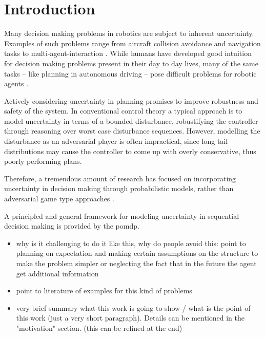 \chapter{Introduction}\label{chap:introduction}

Many decision making problems in robotics are subject to inherent uncertainty.
Examples of such problems range from aircraft collision avoidance and
navigation tasks to multi-agent-interaction
\cite{kochenderfer2012next}. While humans have developed good
intuition for decision making problems present in their day to day lives, many
of the same tasks -- like planning in autonomous driving -- pose difficult
problems for robotic agents \cite{levinson2011towards}.

Actively considering uncertainty in planning promises to improve robustness and
safety of the system. In conventional control theory a typical approach is to model uncertainty in terms of a bounded
disturbance, robustifying the controller through reasoning over worst case
disturbance sequences. However, modelling the disturbance as an adversarial
player is often impractical, since long tail distributions may cause the
controller to come up with overly conservative, thus poorly performing
plans.

Therefore, a tremendous amount of research has focused on incorporating
uncertainty in decision making through probabilistic models, rather than
adversarial game type approaches \cite{roy1999coastal, amato2015planning,
fisac2018probabilistically, choudhury2019dynamic}.

A principled and general framework for modeling uncertainty in sequential
decision making is provided by the \ac{pomdp}.


\begin{itemize}
  \item why is it challenging to do it like this, why do people avoid this:
        point to planning on expectation and making certain assumptions on the structure to
        make the problem simpler or neglecting the fact that
        in the future the agent get additional information
  \item point to literature of examples for this kind of problems
  \item very brief summary what this work is going to show / what is the point
        of this work (just a very short paragraph). Details can be mentioned in the
        "motivation" section. (this can be refined at the end)
\end{itemize}

